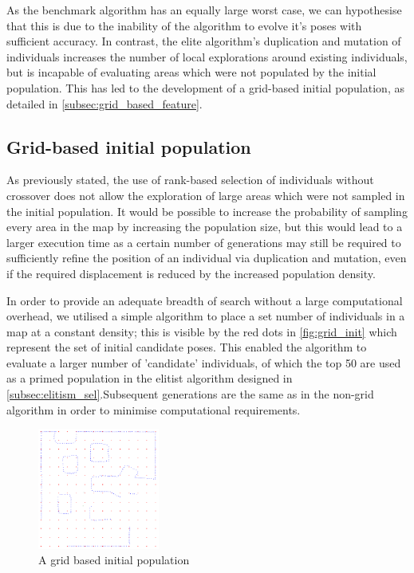 \documentclass[authoryearcitations]{UoYCSproject}
\begin{document}
As the benchmark algorithm has an equally large worst case, we can hypothesise that this is due to the inability of the algorithm to evolve it's poses with sufficient accuracy. In contrast, the elite algorithm's duplication and mutation of individuals increases the number of local explorations around existing individuals, but is incapable of evaluating areas which were not populated by the initial population. This has led to the development of a grid-based initial population, as detailed in \autoref{subsec:grid_based_feature}.

\subsection{Grid-based initial population}
\label{subsec:grid_based_feature}
 As previously stated, the use of rank-based selection of individuals without crossover does not allow the exploration of large areas which were not sampled in the initial population. It would be possible to increase the probability of sampling every area in the map by increasing the population size, but this would lead to a larger execution time as a certain number of generations may still be required to sufficiently refine the position of an individual via duplication and mutation, even if the required displacement is reduced by the increased population density. \newline

 In order to provide an adequate breadth of search without a large computational overhead, we utilised a simple algorithm to place a set number of individuals in a map at a constant density; this is visible by the red dots in \autoref{fig:grid_init} which represent the set of initial candidate poses. This enabled the algorithm to evaluate a larger number of 'candidate' individuals, of which the top 50 are used as a primed population in the elitist algorithm designed in \autoref{subsec:elitism_sel}.Subsequent generations are the same as in the non-grid algorithm in order to minimise computational requirements. \newline

\begin{figure}[H]
\centering
	\includegraphics[width=4cm,keepaspectratio]{images/grid.png}
	\caption{A grid based initial population}
	\label{fig:grid_init}
\end{figure}
\end{document}
